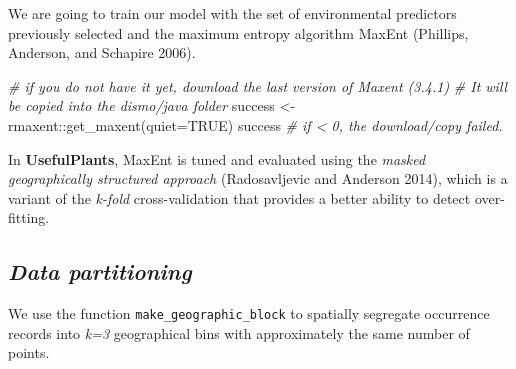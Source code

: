 \documentclass[
]{article}
\newenvironment{Shaded}{\begin{snugshade}}{\end{snugshade}}
\newcommand{\AttributeTok}[1]{\textcolor[rgb]{0.77,0.63,0.00}{#1}}
\newcommand{\CommentTok}[1]{\textcolor[rgb]{0.56,0.35,0.01}{\textit{#1}}}
\newcommand{\ConstantTok}[1]{\textcolor[rgb]{0.00,0.00,0.00}{#1}}
\newcommand{\FunctionTok}[1]{\textcolor[rgb]{0.00,0.00,0.00}{#1}}
\newcommand{\NormalTok}[1]{#1}
\newcommand{\OtherTok}[1]{\textcolor[rgb]{0.56,0.35,0.01}{#1}}
\newcommand{\SpecialCharTok}[1]{\textcolor[rgb]{0.00,0.00,0.00}{#1}}
\begin{document}
We are going to train our model with the set of environmental predictors
previously selected and the maximum entropy algorithm MaxEnt (Phillips,
Anderson, and Schapire 2006).

\begin{Shaded}
\begin{Highlighting}[]
\CommentTok{\# if you do not have it yet, download the last version of Maxent (3.4.1)}
\CommentTok{\# It will be copied into the dismo/java folder}
\NormalTok{success }\OtherTok{\textless{}{-}}\NormalTok{ rmaxent}\SpecialCharTok{::}\FunctionTok{get\_maxent}\NormalTok{(}\AttributeTok{quiet=}\ConstantTok{TRUE}\NormalTok{)}
\NormalTok{success }\CommentTok{\# if \textless{} 0, the download/copy failed.}
\end{Highlighting}
\end{Shaded}

In \textbf{UsefulPlants}, MaxEnt is tuned and evaluated using the
\emph{masked geographically structured approach} (Radosavljevic and
Anderson 2014), which is a variant of the \emph{k-fold} cross-validation
that provides a better ability to detect over-fitting.

\hypertarget{data-partitioning}{%
\subsection{\texorpdfstring{\emph{Data
partitioning}}{Data partitioning}}\label{data-partitioning}}

We use the function \texttt{make\_geographic\_block} to spatially
segregate occurrence records into \emph{k=3} geographical bins with
approximately the same number of points.
\end{document}
